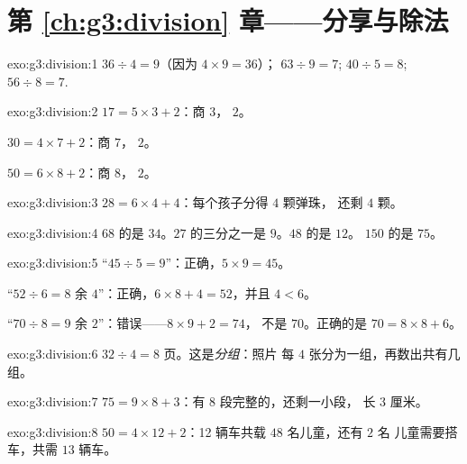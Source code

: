 \section*{第 \ref{ch:g3:division} 章——分享与除法}

\begin{solution}{exo:g3:division:1}
$36 \div 4 = 9$（因为 $4 \times 9 = 36$）；\quad
$63 \div 9 = 7$; \quad $40 \div 5 = 8$; \quad $56 \div 8 = 7$.
\end{solution}

\begin{solution}{exo:g3:division:2}
$17 = 5 \times 3 + 2$：商 $3$， $2$。

$30 = 4 \times 7 + 2$：商 $7$， $2$。

$50 = 6 \times 8 + 2$：商 $8$， $2$。
\end{solution}

\begin{solution}{exo:g3:division:3}
$28 = 6 \times 4 + 4$：每个孩子分得 $4$ 颗弹珠，
还剩 $4$ 颗。
\end{solution}

\begin{solution}{exo:g3:division:4}
$68$ 的是 $34$。$27$ 的三分之一是 $9$。$48$ 的是 $12$。
$150$ 的是 $75$。
\end{solution}

\begin{solution}{exo:g3:division:5}
“$45 \div 5 = 9$”：正确，$5 \times 9 = 45$。

“$52 \div 6 = 8$ 余 $4$”：正确，$6 \times 8 + 4 = 52$，并且
$4 < 6$。

“$70 \div 8 = 9$ 余 $2$”：错误——$8 \times 9 + 2 = 74$，
不是 $70$。正确的是 $70 = 8 \times 8 + 6$。
\end{solution}

\begin{solution}{exo:g3:division:6}
$32 \div 4 = 8$ 页。这是\emph{分组}：照片
每 $4$ 张分为一组，再数出共有几组。
\end{solution}

\begin{solution}{exo:g3:division:7}
$75 = 9 \times 8 + 3$：有 8 段完整的，还剩一小段，
长 $3$ 厘米。
\end{solution}

\begin{solution}{exo:g3:division:8}
$50 = 4 \times 12 + 2$：12 辆车共载 $48$ 名儿童，还有 $2$ 名
儿童需要搭车，共需 $13$ 辆车。
\end{solution}

